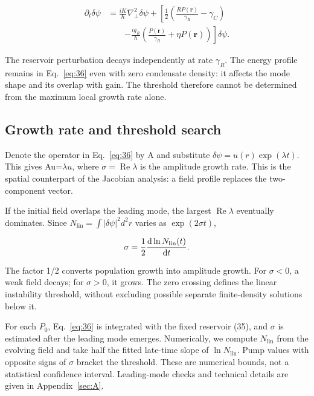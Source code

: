 \documentclass[12pt,a4paper]{article}
\begin{document}
\begin{equation}\label{eq:36}
\begin{aligned}
\partial_t\delta\psi
&=\frac{iK}{\hbar}\nabla_\perp^2\delta\psi
+\left[\frac12\left(\frac{RP(\mathbf r)}{\gamma_R}-\gamma_C\right)\right.\\
&\qquad\left.-\frac{ig_R}{\hbar}\left(\frac{P(\mathbf r)}{\gamma_R}+\eta P(\mathbf r)\right)\right]\delta\psi.
\end{aligned}\end{equation}

The reservoir perturbation decays independently at rate $\gamma_{R}$. The energy profile remains in Eq.~\eqref{eq:36} even with zero condensate density: it affects the mode shape and its overlap with gain. The threshold therefore cannot be determined from the maximum local growth rate alone.

\subsection{Growth rate and threshold search}\label{sec:8.2}

Denote the operator in Eq.~\eqref{eq:36} by A and substitute $\delta \psi=u(r)\exp(\lambda t)$. This gives Au=$\lambda u$, where $\sigma=\operatorname{Re} \lambda$ is the amplitude growth rate. This is the spatial counterpart of the Jacobian analysis: a field profile replaces the two-component vector.

If the initial field overlaps the leading mode, the largest $\operatorname{Re} \lambda$ eventually dominates. Since $N_{\mathrm{lin}}=\int|\delta \psi|^2d^{2}r$ varies as $\exp(2 \sigma t)$,

\begin{equation}\label{eq:37}
\sigma=\frac12\frac{\mathrm d\ln N_{\rm lin}(t)}{\mathrm dt}.\end{equation}

The factor 1/2 converts population growth into amplitude growth. For $\sigma<0$, a weak field decays; for $\sigma>0$, it grows. The zero crossing defines the linear instability threshold, without excluding possible separate finite-density solutions below it.

For each $P_{0}$, Eq.~\eqref{eq:36} is integrated with the fixed reservoir (35), and $\sigma$ is estimated after the leading mode emerges. Numerically, we compute $N_{\mathrm{lin}}$ from the evolving field and take half the fitted late-time slope of $\ln N_{\mathrm{lin}}$. Pump values with opposite signs of $\sigma$ bracket the threshold. These are numerical bounds, not a statistical confidence interval. Leading-mode checks and technical details are given in Appendix~\ref{sec:A}.
\end{document}
